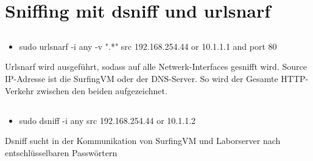 \documentclass[12pt]{article}
\theoremstyle{plain}
\begin{document}
\section{Sniffing mit dsniff und urlsnarf}
\subsection{}
\begin{itemize}
\item sudo urlsnarf -i any -v ".*" src 192.168.254.44 or 10.1.1.1 and port 80
\end{itemize}
Urlsnarf wird ausgeführt, sodass auf alle Netwerk-Interfaces gesnifft wird. Source IP-Adresse ist die SurfingVM oder der DNS-Server. So wird der Gesamte HTTP-Verkehr zwischen den beiden aufgezeichnet.
\subsection{}
\begin{itemize}
\item sudo dsniff -i any src 192.168.254.44 or 10.1.1.2
\end{itemize}
Dsniff sucht in der Kommunikation von SurfingVM und Laborserver nach entschlüsselbaren Passwörtern
\end{document}
